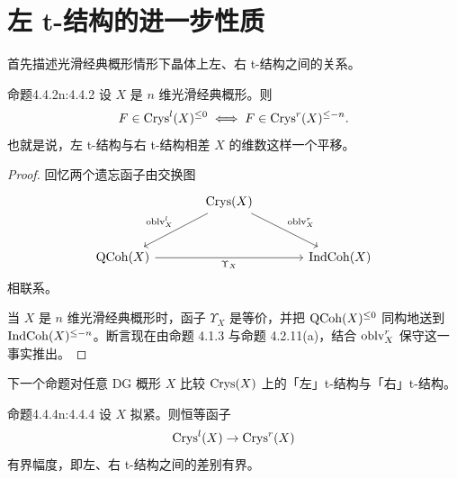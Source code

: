 \section{左 t-结构的进一步性质}

首先描述光滑经典概形情形下晶体上左、右 t-结构之间的关系。

\begin{othm}{命题}{4.4.2}{n:4.4.2}
设 $X$ 是 $n$ 维光滑经典概形。则
\[
F\in\mathrm{Crys}^l(X)^{\leq 0}\iff F\in\mathrm{Crys}^r(X)^{\leq -n}.
\]
也就是说，左 t-结构与右 t-结构相差 $X$ 的维数这样一个平移。
\end{othm}

\begin{proof}
回忆两个遗忘函子由交换图
\[
\begin{tikzcd}[column sep=large, row sep=large]
 & \Crys(X) \arrow[dl, "\oblv^l_X"'] \arrow[dr, "\oblv^r_X"] & \\
 \QCoh(X) \arrow[rr, "\Upsilon_X"'] & & \IndCoh(X)
\end{tikzcd}
\]
相联系。

当 $X$ 是 $n$ 维光滑经典概形时，函子 $\Upsilon_X$ 是等价，并把 $\mathrm{QCoh}(X)^{\leq 0}$ 同构地送到 $\mathrm{IndCoh}(X)^{\leq -n}$。断言现在由命题 4.1.3 与命题 4.2.11(a)，结合 $\mathrm{oblv}^r_X$ 保守这一事实推出。
\end{proof}

下一个命题对任意 DG 概形 $X$ 比较 $\mathrm{Crys}(X)$ 上的「左」t-结构与「右」t-结构。

\begin{othm}{命题}{4.4.4}{n:4.4.4}
设 $X$ 拟紧。则恒等函子
\[
\mathrm{Crys}^l(X)\to\mathrm{Crys}^r(X)
\]
有界幅度，即左、右 t-结构之间的差别有界。
\end{othm}

